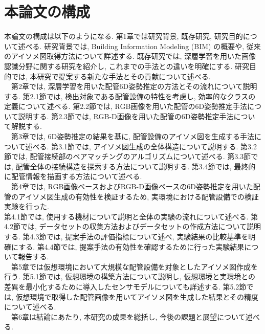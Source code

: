 \section{本論文の構成}
本論文の構成は以下のようになる.
第1章では研究背景, 既存研究, 研究目的について述べる. 
研究背景では, Building Information Modeling (BIM) の概要や, 従来のアイソメ図取得方法について詳述する. 
既存研究では, 深層学習を用いた画像認識分野に関する研究を紹介し, これまでの手法との違いを明確にする. 
研究目的では, 本研究で提案する新たな手法とその貢献について述べる. \\
　第2章では, 深層学習を用いた配管6D姿勢推定の方法とその流れについて説明する. 
第2.1節では, 検出対象である配管設備の特性を考慮し, 効率的なクラスの定義について述べる. 
第2.2節では, RGB画像を用いた配管の6D姿勢推定手法について説明する. 
第2.3節では, RGB-D画像を用いた配管の6D姿勢推定手法について解説する. \\
　第3章では, 6D姿勢推定の結果を基に, 配管設備のアイソメ図を生成する手法について述べる. 
第3.1節では, アイソメ図生成の全体構造について説明する. 
第3.2節では, 配管接続部のペアマッチングのアルゴリズムについて述べる. 
第3.3節では, 配管全体の接続構造を探索する方法について説明する. 
第3.4節では, 最終的に配管情報を描画する方法について述べる. \\
　第4章では, RGB画像ベースおよびRGB-D画像ベースの6D姿勢推定を用いた配管のアイソメ図生成の有効性を検証するため, 実環境における配管設備での検証実験を行った. \\
第4.1節では, 使用する機材について説明と全体の実験の流れについて述べる. 
第4.2節では, データセットの収集方法およびデータセットの作成方法について説明する. 
第4.3節では, 提案手法の評価指標について述べ, 実験結果の比較基準を明確にする. 
第4.4節では, 提案手法の有効性を確認するために行った実験結果について報告する. \\
　第5章では仮想環境において大規模な配管設備を対象としたアイソメ図作成を行う. 
第5.1節では, 仮想環境の構築方法について説明し, 仮想環境と実環境との差異を最小化するために導入したセンサモデルについても詳述する. 
第5.2節では, 仮想環境で取得した配管画像を用いてアイソメ図を生成した結果とその精度について述べる. \\
　第6章は結論にあたり, 本研究の成果を総括し, 今後の課題と展望について述べる. 
